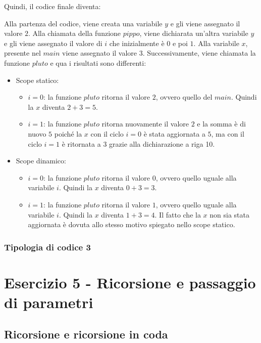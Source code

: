 \documentclass[a4paper]{article}
\begin{document}
	\noindent
	Quindi, il codice finale diventa:
	
	Alla partenza del codice, viene creata una variabile $y$ e gli viene assegnato il valore $2$. Alla chiamata della funzione $pippo$, viene dichiarata un'altra variabile $y$ e gli viene assegnato il valore di $i$ che inizialmente è $0$ e poi $1$. Alla variabile $x$, presente nel $main$ viene assegnato il valore $3$. Successivamente, viene chiamata la funzione $pluto$ e qua i risultati sono differenti:
	\begin{itemize}
		\item Scope statico:
			\begin{itemize}
				\item $i = 0$: la funzione $pluto$ ritorna il valore $2$, ovvero quello del $main$. Quindi la $x$ diventa $2 + 3 = 5$.
				
				\item $i = 1$: la funzione $pluto$ ritorna nuovamente il valore $2$ e la somma è di nuovo $5$ poiché la $x$ con il ciclo $i=0$ è stata aggiornata a $5$, ma con il ciclo $i=1$ è ritornata a $3$ grazie alla dichiarazione a riga 10.
			\end{itemize}
		
		\item Scope dinamico:
			\begin{itemize}
				\item $i = 0$: la funzione $pluto$ ritorna il valore $0$, ovvero quello uguale alla variabile $i$. Quindi la $x$ diventa $0 + 3 = 3$.
				
				\item $i = 1$: la funzione $pluto$ ritorna il valore $1$, ovvero quello uguale alla variabile $i$. Quindi la $x$ diventa $1 + 3 = 4$. Il fatto che la $x$ non sia stata aggiornata è dovuta allo stesso motivo spiegato nello scope statico.
			\end{itemize}
	\end{itemize}\newpage
	
	\subsubsection{Tipologia di codice 3}
	\newpage
	
	
	\section{Esercizio 5 - Ricorsione e passaggio di parametri}
	
	\subsection{Ricorsione e ricorsione in coda}
	
\end{document}
